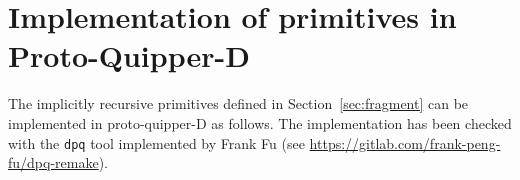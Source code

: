 \section{Implementation of primitives in Proto-Quipper-D}%
\label{sec:primitive-trans}

The implicitly recursive primitives defined in Section~\ref{sec:fragment}
can be implemented in proto-quipper-D as follows.
The implementation has been checked with the \texttt{dpq} tool
implemented by Frank Fu (see \url{https://gitlab.com/frank-peng-fu/dpq-remake}).

\inputminted{haskell}{appendix/SZXEncoding/primitives.dpq}
